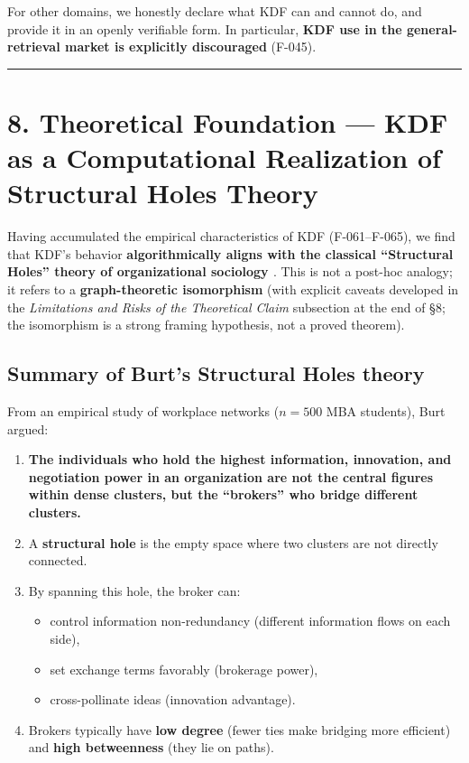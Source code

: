 For other domains, we honestly declare what KDF can and cannot do, and provide it in an openly verifiable form. In particular, \textbf{KDF use in the general-retrieval market is explicitly discouraged} (F-045).

\begin{center}\rule{0.5\linewidth}{0.5pt}\end{center}

\section{8. Theoretical Foundation --- KDF as a Computational Realization of Structural Holes Theory}\label{theoretical-foundation-kdf-as-a-computational-realization-of-structural-holes-theory}

Having accumulated the empirical characteristics of KDF (F-061--F-065), we find that KDF's behavior \textbf{algorithmically aligns with the classical ``Structural Holes'' theory of organizational sociology \citep{burt1992structuralholes}}. This is not a post-hoc analogy; it refers to a \textbf{graph-theoretic isomorphism} (with explicit caveats developed in the \emph{Limitations and Risks of the Theoretical Claim} subsection at the end of §8; the isomorphism is a strong framing hypothesis, not a proved theorem).

\subsection{\texorpdfstring{Summary of Burt's Structural Holes theory \citep{burt1992structuralholes}}{Summary of Burt's Structural Holes theory {[}@burt1992structuralholes{]}}}\label{summary-of-burts-structural-holes-theory-burt1992structuralholes}

From an empirical study of workplace networks (\(n = 500\) MBA students), Burt argued:

\begin{enumerate}
\def\labelenumi{\arabic{enumi}.}
\tightlist
\item
  \textbf{The individuals who hold the highest information, innovation, and negotiation power in an organization are not the central figures within dense clusters, but the ``brokers'' who bridge different clusters.}
\item
  A \textbf{structural hole} is the empty space where two clusters are not directly connected.
\item
  By spanning this hole, the broker can:

  \begin{itemize}
  \tightlist
  \item
    control information non-redundancy (different information flows on each side),
  \item
    set exchange terms favorably (brokerage power),
  \item
    cross-pollinate ideas (innovation advantage).
  \end{itemize}
\item
  Brokers typically have \textbf{low degree} (fewer ties make bridging more efficient) and \textbf{high betweenness} (they lie on paths).
\end{enumerate}

